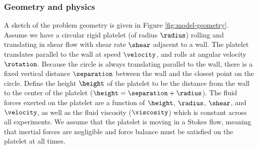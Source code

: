 \subsubsection{Geometry and physics}
\label{sec:geometry-physics}

A sketch of the problem geometry is given in Figure
\ref{fig:model-geometry}. Assume we have a circular rigid platelet (of
radius $\radius$) rolling and translating in shear flow with shear
rate $\shear$ adjacent to a wall. The platelet translates parallel to
the wall at speed $\velocity$, and rolls at angular velocity
$\rotation$. Because the circle is always translating parallel to the
wall, there is a fixed vertical distance $\separation$ between the
wall and the closest point on the circle. Define the height $\height$
of the platelet to be the distance from the wall to the center of the
platelet ($\height = \separation + \radius$). The fluid forces exerted
on the platelet are a function of $\height$, $\radius$, $\shear$, and
$\velocity$, as well as the fluid viscosity ($\viscosity$) which is
constant across all experiments. We assume that the platelet is moving
in a Stokes flow, meaning that inertial forces are negligible and
force balance must be satisfied on the platelet at all times.

